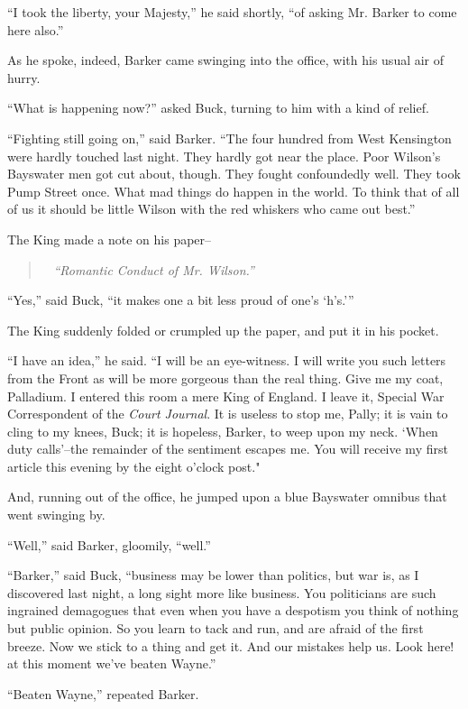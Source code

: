 \documentclass{book}
\newenvironment{mdblockquote}{%
  \begin{quotation}
    \
}{%
  \end{quotation}
}
\begin{document}
“I took the liberty, your Majesty,” he said shortly, “of asking Mr. Barker to come here also.”

As he spoke, indeed, Barker came swinging into the office, with his usual air of hurry.

“What is happening now?” asked Buck, turning to him with a kind of relief.

“Fighting still going on,” said Barker. “The four hundred from West Kensington were hardly touched last night. They hardly got near the place. Poor Wilson’s Bayswater men got cut about, though. They fought confoundedly well. They took Pump Street once. What mad things do happen in the world. To think that of all of us it should be little Wilson with the red whiskers who came out best.”

The King made a note on his paper–

\begin{mdblockquote}
	\emph{“Romantic Conduct of Mr. Wilson.”}


\end{mdblockquote}
“Yes,” said Buck, “it makes one a bit less proud of one’s ‘h’s.’”

The King suddenly folded or crumpled up the paper, and put it in his pocket.

“I have an idea,” he said. “I will be an eye-witness. I will write you such letters from the Front as will be more gorgeous than the real thing. Give me my coat, Palladium. I entered this room a mere King of England. I leave it, Special War Correspondent of the \emph{Court Journal}. It is useless to stop me, Pally; it is vain to cling to my knees, Buck; it is hopeless, Barker, to weep upon my neck. ‘When duty calls’–the remainder of the sentiment escapes me. You will receive my first article this evening by the eight o’clock post."

And, running out of the office, he jumped upon a blue Bayswater omnibus that went swinging by.

“Well,” said Barker, gloomily, “well.”

“Barker,” said Buck, “business may be lower than politics, but war is, as I discovered last night, a long sight more like business. You politicians are such ingrained demagogues that even when you have a despotism you think of nothing but public opinion. So you learn to tack and run, and are afraid of the first breeze. Now we stick to a thing and get it. And our mistakes help us. Look here! at this moment we’ve beaten Wayne.”

“Beaten Wayne,” repeated Barker.
\end{document}
